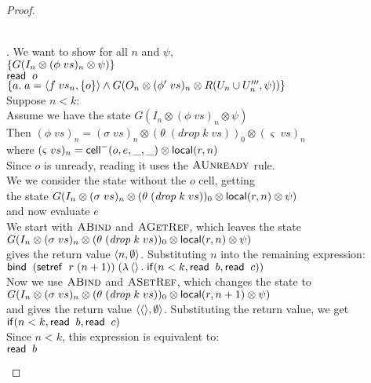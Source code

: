 \begin{proof}
\begin{enumerate}
\begin{tabbedproof}
  \\ . We want to show for all $n$ and $\psi$, \\
  \ooox $\{{G(I_n \otimes (\phi\;vs)_n \otimes \psi)}\}$ \\
  \ooox $\mathsf{read}\;\;o$ \\
  \ooox $\{{a.\;a = \left<{f\;vs_n},{\{{o}\}}\right> \land G(O_n \otimes (\phi'\;vs)_n \otimes R(U_n \cup U'''_n, \psi))}\}$ \\
  \ooo Suppose $n < k$: \\ 
  \oooo Assume we have the state $G(I_n \otimes (\phi\;vs)_n \otimes \psi)$ \\
  \oooo Then $(\phi\;vs)_n = (\sigma\;vs)_n \otimes (\theta\;(\mathit{drop}\;k\;vs))_0 \otimes (\varsigma\;vs)_n$ \\
  \oooo where $(\varsigma\;vs)_n = \mathsf{cell}^{-}({o}, {e}, {\_}, {\_}) \otimes \mathsf{local}({r}, {n})$ \\
  \oooo Since $o$ is unready, reading it uses the $\textsc{AUnready}$ rule. \\
  \oooo We we consider the state without the $o$ cell, getting \\
  \oooo the state $G(I_n \otimes (\sigma\;vs)_n \otimes (\theta\;(\mathit{drop}\;k\;vs))_0 \otimes \mathsf{local}({r}, {n}) \otimes \psi)$ \\ 
  \oooo and now evaluate $e$ \\ 
  \oooo We start with $\textsc{ABind}$ and $\textsc{AGetRef}$, which leaves the state \\
  \ooooo $G(I_n \otimes (\sigma\;vs)_n \otimes (\theta\;(\mathit{drop}\;k\;vs))_0 \otimes \mathsf{local}({r}, {n}) \otimes \psi)$ \\ 
  \oooo gives the return value $\left<{n},{\emptyset}\right>$. Substituting $n$ into the remaining expression: \\
  \ooooo $\mathsf{bind}\;\;(\mathsf{setref}\;\;r\;(n+1))\; (\lambda \left<\right>.\;\mathsf{if}({n < k}, {\mathsf{read}\;\;b}, {\mathsf{read}\;\;c}))$ \\
  \oooo Now we use $\textsc{ABind}$ and $\textsc{ASetRef}$, which changes the state to \\
  \oooo $G(I_n \otimes (\sigma\;vs)_n \otimes (\theta\;(\mathit{drop}\;k\;vs))_0 \otimes \mathsf{local}({r}, {n+1}) \otimes \psi)$ \\ 
  \oooo and gives the return value $\left<{\left<\right>},{\emptyset}\right>$. Substituting the return value, we get \\
  \ooooo $\mathsf{if}({n < k}, {\mathsf{read}\;\;b}, {\mathsf{read}\;\;c})$ \\
  \oooo Since $n < k$, this expression is equivalent to: \\
  \ooooo $\mathsf{read}\;\;b$ \\

\end{tabbedproof}
\end{enumerate}
\end{proof}
